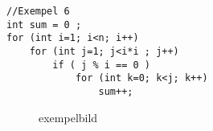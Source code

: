 \documentclass[a4paper,10pt,oneside,onecolumn]{article}
\begin{document}
\begin{lstlisting}
//Exempel 6
int sum = 0 ;
for (int i=1; i<n; i++)
	for (int j=1; j<i*i ; j++)
		if ( j % i == 0 )
			for (int k=0; k<j; k++)
				sum++;
\end{lstlisting}
%

%


\begin{figure}[htbp]
	\centering
	\caption{exempelbild}
\end{figure}


%
%
\end{document}
